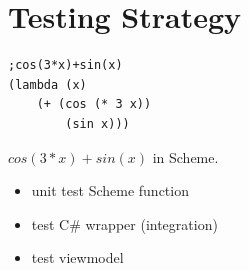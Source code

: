 \documentclass[a4paper,12pt]{article}
\begin{document}
\section{Testing Strategy}	

\begin{listing}[H]
\begin{verbatim}
;cos(3*x)+sin(x)
(lambda (x)
	(+ (cos (* 3 x))
		(sin x)))
\end{verbatim}	

\caption{$cos(3*x)+sin(x)$ in Scheme.}
\label{lst:Scheme1}
\end{listing}

\begin{itemize}
\item unit test Scheme function
\item test C\# wrapper (integration)
\item test viewmodel
\end{itemize}
	
\end{document}
